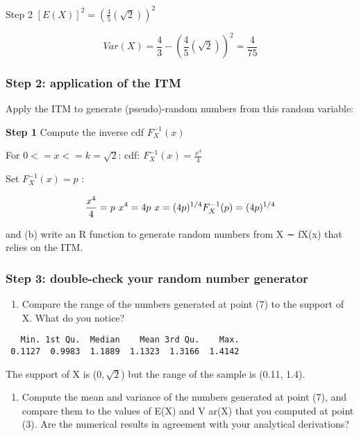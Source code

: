 \documentclass[
  letterpaper,
  DIV=11,
  numbers=noendperiod]{scrreprt}
\providecommand{\tightlist}{%
  \setlength{\itemsep}{0pt}\setlength{\parskip}{0pt}}\usepackage{longtable,booktabs,array}
\begin{document}
Step 2 \([E(X)]^2 = (\frac{4}{5}(\sqrt 2))^2\)

\[
Var(X) = \frac{4}{3} - (\frac{4}{5}(\sqrt 2))^2 = \frac{4}{75}
\]

\subsubsection{Step 2: application of the
ITM}\label{step-2-application-of-the-itm}

Apply the ITM to generate (pseudo)-random numbers from this random
variable:

\textbf{Step 1} Compute the inverse cdf \(F^{−1}_X (x)\)

For \(0<=x<=k = \sqrt{2}\): cdf: \(F_X^{-1}(x) = \frac{x^4}{4}\)

Set \(F_X^{-1}(x) = p\) :

\[
\frac{x^4}{4} = p \ x^4 = 4p \ x = (4p)^{1/4} \\
F_X^{-1}(p) = (4p)^{1/4}
\]

and (b) write an R function to generate random numbers from X ∼ fX(x)
that relies on the ITM.

\subsubsection{Step 3: double-check your random number
generator}\label{step-3-double-check-your-random-number-generator}

\begin{enumerate}
\def\labelenumi{\arabic{enumi}.}
\setcounter{enumi}{7}
\tightlist
\item
  Compare the range of the numbers generated at point (7) to the support
  of X. What do you notice?
\end{enumerate}

\begin{verbatim}
   Min. 1st Qu.  Median    Mean 3rd Qu.    Max. 
 0.1127  0.9983  1.1889  1.1323  1.3166  1.4142 
\end{verbatim}

The support of X is (\(0, \sqrt2\)) but the range of the sample is
(0.11, 1.4).

\begin{enumerate}
\def\labelenumi{\arabic{enumi}.}
\setcounter{enumi}{8}
\tightlist
\item
  Compute the mean and variance of the numbers generated at point (7),
  and compare them to the values of E(X) and V ar(X) that you computed
  at point (3). Are the numerical results in agreement with your
  analytical derivations?
\end{enumerate}
\end{document}
